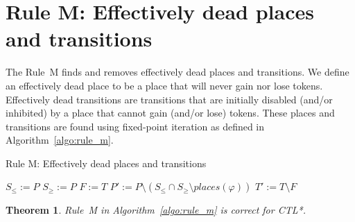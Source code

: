 \documentclass[11pt]{article}
\newtheorem{theorem}{Theorem}
\begin{document}
    \section*{Rule M: Effectively dead places and transitions}\label{sec:rule_m}
    The Rule~M finds and removes effectively dead places and transitions.
    We define an effectively dead place to be a place that will never gain nor lose tokens.
    Effectively dead transitions are transitions that are initially disabled (and/or inhibited)
    by a place that cannot gain (and/or lose) tokens.
    These places and transitions are found using fixed-point iteration as defined in Algorithm~\ref{algo:rule_m}.

    \begin{algorithm}
        \vspace{0.2cm}
        \caption{Rule M: Effectively dead places and transitions}
        \label{algo:rule_m}
        \DontPrintSemicolon
        \LinesNumbered
        \vspace{1mm}
        $S_\leq:=P$
        $S_\geq:=P$
        $F:=T$
        $P':=P\setminus(S_\leq\cap S_\geq\setminus places(\varphi))$\;
        $T':=T\setminus F$\;
        \vspace{0.2cm}
    \end{algorithm}

    \begin{theorem}\label{theorem:rule_m}
        Rule~M in Algorithm~\ref{algo:rule_m} is correct for CTL*.
    \end{theorem}
\end{document}
